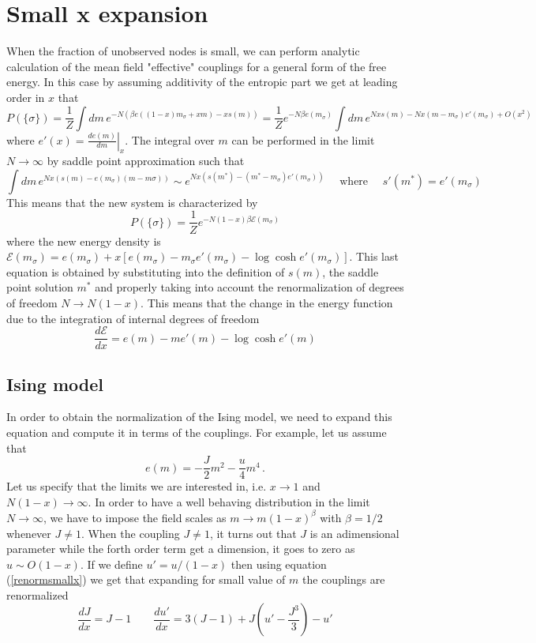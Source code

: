 \documentclass[aps,pre,noshowpacs]{revtex4}
\begin{document}
\section{Small x expansion}

When the fraction of unobserved nodes is small, we can perform analytic calculation of the mean field "effective" couplings for a general form of the free energy. In this case by assuming additivity of the entropic part
we get at leading order in $x$ that
\begin{equation}
P(\{\sigma\} )=\frac{1}{Z} \int dm \, e^{-N \left(\beta e( (1-x) m_\sigma + x m) - x s(m)\right)}= \frac{1}{Z} e^{ -N \beta e( m_\sigma) }\int dm\, e ^{ N x s(m) -N x (m-m_\sigma) e'(m_\sigma)  + O(x^2)}
\end{equation}
where $e'(x)= \left .\frac{d e(m)}{d m}\right |_{x}$. The integral over $m$ can be performed in the limit $N\to \infty$ by saddle point approximation 
such that $$\int dm\, e^{Nx ( s(m)-e(m_\sigma) (m-m\sigma))}\sim e^{Nx(s(m^*)-(m^*-m_\sigma) e'(m_\sigma))} \quad \text{ where  }\quad  s'(m^*)=e'(m_\sigma)$$
This means that the new system is characterized by
\begin{equation}
P(\{\sigma\}) = \frac{1}{Z}e^{-N(1-x)\beta \mathcal{E}(m_\sigma)}
\end{equation}
where the new energy density is
$\mathcal{E}(m_\sigma) = e(m_\sigma) + x \left[ e(m_\sigma) - m_\sigma e'(m_\sigma) -\log \cosh e'(m_\sigma)\right]$. This last equation is obtained by substituting into the definition of $s(m)$, the saddle point solution $m^*$ and properly taking into account the renormalization of degrees of freedom $N \to N(1-x)$. This means that
the change in the energy function due to the integration of internal degrees of freedom 
\begin{equation}\label{renormsmallx}
\frac{d \mathcal{E}}{dx}=e(m) - m e'(m) -\log \cosh e'(m)
\end{equation}
\subsection{Ising model}
In order to obtain the normalization of the Ising model, we need to expand this equation and compute it in terms of the couplings. 
For example, let us assume that $$e(m)=-\frac{J}{2} m^2 - \frac{u}{4} m^4\,.$$ Let us specify that the limits we are interested in, i.e. $x\to 1$ and $N(1-x)\to \infty$. In order to have a well behaving distribution in the limit $N \to \infty$, we have to impose the field scales as $m \to m (1-x)^\beta $ with $\beta=1/2$ whenever $J\neq 1$. When the coupling $J\neq 1$, it turns out that $J$ is an adimensional parameter while the forth order term get a dimension, it goes to zero as $u \sim O(1-x)$. If we define $u'=u/(1-x)$ then using equation (\ref{renormsmallx}) we get that expanding for small value of $m$ the couplings are renormalized
\begin{equation}
\frac{dJ}{dx} = J-1 \qquad \frac{du'}{dx}=3(J-1) + J\left(u'-\frac{J^3}{3}\right) -u' 
\end{equation}
\end{document}
